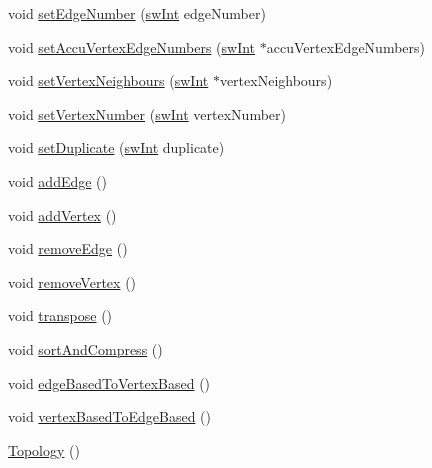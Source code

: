 \begin{DoxyCompactItemize}
\item 
void \mbox{\hyperlink{classUNAT_1_1Topology_aaf9838827f3d81110b6911a23fc28864}{set\+Edge\+Number}} (\mbox{\hyperlink{include_2swMacro_8h_a113cf5f6b5377cdf3fac6aa4e443e9aa}{sw\+Int}} edge\+Number)
\item 
void \mbox{\hyperlink{classUNAT_1_1Topology_a06ea506a220c6eb45a6beb4106aa0dbc}{set\+Accu\+Vertex\+Edge\+Numbers}} (\mbox{\hyperlink{include_2swMacro_8h_a113cf5f6b5377cdf3fac6aa4e443e9aa}{sw\+Int}} $\ast$accu\+Vertex\+Edge\+Numbers)
\item 
void \mbox{\hyperlink{classUNAT_1_1Topology_aa82494c4b097ebb30f323947c9f3161e}{set\+Vertex\+Neighbours}} (\mbox{\hyperlink{include_2swMacro_8h_a113cf5f6b5377cdf3fac6aa4e443e9aa}{sw\+Int}} $\ast$vertex\+Neighbours)
\item 
void \mbox{\hyperlink{classUNAT_1_1Topology_aeddafa74ad2dc0769cf5e0a3384a20ce}{set\+Vertex\+Number}} (\mbox{\hyperlink{include_2swMacro_8h_a113cf5f6b5377cdf3fac6aa4e443e9aa}{sw\+Int}} vertex\+Number)
\item 
void \mbox{\hyperlink{classUNAT_1_1Topology_a786790063b5399bb3bb8b6fc6761ca5a}{set\+Duplicate}} (\mbox{\hyperlink{include_2swMacro_8h_a113cf5f6b5377cdf3fac6aa4e443e9aa}{sw\+Int}} duplicate)
\item 
void \mbox{\hyperlink{classUNAT_1_1Topology_a6f341852613126c689a10a2785a08c55}{add\+Edge}} ()
\item 
void \mbox{\hyperlink{classUNAT_1_1Topology_adfc7a4148d5430ae7af6ed1d499875f7}{add\+Vertex}} ()
\item 
void \mbox{\hyperlink{classUNAT_1_1Topology_a359fdcc98879b6de79d9a9ea8221bc68}{remove\+Edge}} ()
\item 
void \mbox{\hyperlink{classUNAT_1_1Topology_a3116756821bb4fdedfe16f2f0256552c}{remove\+Vertex}} ()
\item 
void \mbox{\hyperlink{classUNAT_1_1Topology_aee69e4993644c249fdaaf55627309309}{transpose}} ()
\item 
void \mbox{\hyperlink{classUNAT_1_1Topology_a2293a4becd4f59f38364701e7ea7bf1d}{sort\+And\+Compress}} ()
\item 
void \mbox{\hyperlink{classUNAT_1_1Topology_aeac30ca87544104afb11344fdd5ac3a9}{edge\+Based\+To\+Vertex\+Based}} ()
\item 
void \mbox{\hyperlink{classUNAT_1_1Topology_a406ac8df118240b4245dac4e3d9ed634}{vertex\+Based\+To\+Edge\+Based}} ()
\item 
\mbox{\hyperlink{classUNAT_1_1Topology_abca137a381a1bdd9c44afa3056f1d45b}{Topology}} ()
\item 

\end{DoxyCompactItemize}
